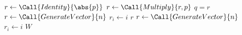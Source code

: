 \State $r\gets\Call{Identity}{\abs{p}}$
\State $r\gets\Call{Multiply}{r,p}$
\EndFor
\State \Return $q=r$
\EndFunction
{}
\State $r\gets\Call{GenerateVector}{n}$
\State $r_i\gets i$
\EndFor
\State \Return $r$
\EndFunction
{}
\State $r\gets\Call{GenerateVector}{n}$
\State $r_i\gets i$
\EndFor
\State \Return $W$
\EndFunction